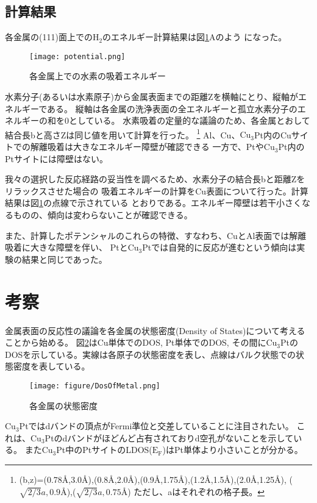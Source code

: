 \documentclass[12pt]{ltjsarticle}
\begin{document}
\subsection{計算結果}
各金属の(111)面上での$\text{H}_\text{2}$のエネルギー計算結果は図\ref{fig:potential}Aのよう
になった。\\
\begin{figure}[hbtp]
    \begin{center}
     \texttt{[image: potential.png]}
    \end{center}
    \caption{各金属上での水素の吸着エネルギー}
    \label{fig:potential}
\end{figure}
水素分子(あるいは水素原子)から金属表面までの距離Zを横軸にとり、縦軸がエネルギーである。
縦軸は各金属の洗浄表面の全エネルギーと孤立水素分子のエネルギーの和を0としている。
水素吸着の定量的な議論のため、各金属とおして結合長bと高さZは同じ値を用いて計算を行った。
\footnote{(b,z)=(0.78$\mbox{\AA}$,3.0$\mbox{\AA}$),(0.8$\mbox{\AA}$,2.0$\mbox{\AA}$),(0.9$\mbox{\AA}$,1.75$\mbox{\AA}$),(1.2$\mbox{\AA}$,1.5$\mbox{\AA}$),(2.0$\mbox{\AA}$,1.25$\mbox{\AA}$),
($\sqrt{2/3}a,0.9\mbox{\AA}$),($\sqrt{2/3}a,0.75\mbox{\AA}$) ただし、aはそれぞれの格子長。}
Al、Cu、$\text{Cu}_\text{3}$Pt内のCuサイトでの解離吸着は大きなエネルギー障壁が確認できる
一方で、Ptや$\text{Cu}_\text{3}$Pt内のPtサイトには障壁はない。

我々の選択した反応経路の妥当性を調べるため、水素分子の結合長bと距離Zをリラックスさせた場合の
吸着エネルギーの計算をCu表面について行った。計算結果は図\ref{fig:potential}の点線で示されている
とおりである。エネルギー障壁は若干小さくなるものの、傾向は変わらないことが確認できる。

また、計算したポテンシャルのこれらの特徴、すなわち、CuとAl表面では解離吸着に大きな障壁を伴い、
Ptと$\text{Cu}_\text{3}$Ptでは自発的に反応が進むという傾向は実験の結果と同じであった。

\section{考察}

金属表面の反応性の議論を各金属の状態密度(Density of States)について考えることから始める。
図\ref{fig:dosmetal}はCu単体でのDOS, Pt単体でのDOS, その間に$\text{Cu}_\text{3}$Ptの
DOSを示している。実線は各原子の状態密度を表し、点線はバルク状態での状態密度を表している。
\begin{figure}[hbtp]
    \begin{center}
     \texttt{[image: figure/DosOfMetal.png]}
    \end{center}
    \caption{各金属の状態密度}
    \label{fig:dosmetal}
\end{figure}
$\text{Cu}_\text{3}$Ptではdバンドの頂点がFermi準位と交差していることに注目されたい。
これは、$\text{Cu}_\text{3}$Ptのdバンドがほどんど占有されておりd空孔がないことを示している。
また$\text{Cu}_\text{3}$Pt中のPtサイトのLDOS($\text{E}_\text{F}$)はPt単体より小さいことが分かる。
\end{document}
